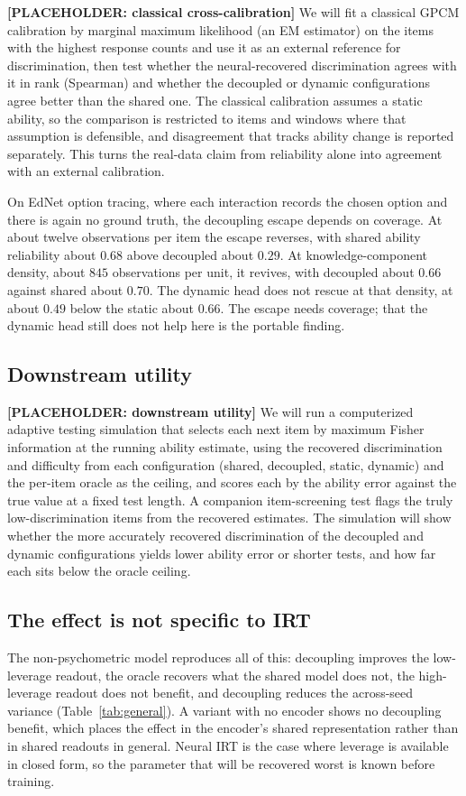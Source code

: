 \documentclass[twocolumn,10pt]{article}
\begin{document}
\textbf{[PLACEHOLDER: classical cross-calibration]} We will fit a classical GPCM calibration
by marginal maximum likelihood (an EM estimator) on the items with the highest response
counts and use it as an external reference for discrimination, then test whether the
neural-recovered discrimination agrees with it in rank (Spearman) and whether the decoupled
or dynamic configurations agree better than the shared one. The classical calibration
assumes a static ability, so the comparison is restricted to items and windows where that
assumption is defensible, and disagreement that tracks ability change is reported
separately. This turns the real-data claim from reliability alone into agreement with an
external calibration.

On EdNet option tracing, where each interaction records the chosen option and there is again
no ground truth, the decoupling escape depends on coverage. At about twelve observations per
item the escape reverses, with shared ability reliability about $0.68$ above decoupled about
$0.29$. At knowledge-component density, about $845$ observations per unit, it revives, with
decoupled about $0.66$ against shared about $0.70$. The dynamic head does not rescue at that
density, at about $0.49$ below the static about $0.66$. The escape needs coverage; that the
dynamic head still does not help here is the portable finding.

\subsection{Downstream utility}
\textbf{[PLACEHOLDER: downstream utility]} We will run a computerized adaptive testing
simulation that selects each next item by maximum Fisher information at the running ability
estimate, using the recovered discrimination and difficulty from each configuration (shared,
decoupled, static, dynamic) and the per-item oracle as the ceiling, and scores each by the
ability error against the true value at a fixed test length. A companion item-screening test
flags the truly low-discrimination items from the recovered estimates. The simulation will
show whether the more accurately recovered discrimination of the decoupled and dynamic
configurations yields lower ability error or shorter tests, and how far each sits below the
oracle ceiling.

\subsection{The effect is not specific to IRT}
The non-psychometric model reproduces all of this: decoupling improves the low-leverage
readout, the oracle recovers what the shared model does not, the high-leverage readout does
not benefit, and decoupling reduces the across-seed variance (Table~\ref{tab:general}). A
variant with no encoder shows no decoupling benefit, %
which places the effect in the encoder's shared representation rather than in shared readouts
in general. Neural IRT is the case where leverage is available in closed form, so the
parameter that will be recovered worst is known before training.
\end{document}
